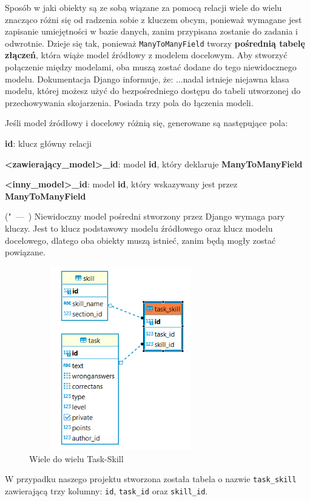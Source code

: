 \documentclass[oneside,polski,logo,indent]{amuthesis}
\let\oldquote\quote
\let\endoldquote\endquote
\renewenvironment{quote}[2][]
  {\if\relax\detokenize{#1}\relax
     \def\quoteauthor{#2}%
   \else
     \def\quoteauthor{#2~---~#1}%
   \fi
   \oldquote}
  {\par\nobreak\smallskip\hfill(\quoteauthor)%
   \endoldquote\addvspace{\bigskipamount}}
\begin{document}
Sposób w jaki obiekty są ze sobą wiązane za pomocą relacji wiele do wielu znacząco różni się od radzenia sobie z kluczem obcym, ponieważ wymagane jest zapisanie umiejętności w bazie danych, zanim przypisana zostanie do zadania i odwrotnie. Dzieje się tak, ponieważ \texttt{ManyToManyField} tworzy \textbf{pośrednią tabelę złączeń}, która wiąże model źródłowy z modelem docelowym. Aby stworzyć połączenie między modelami, oba muszą zostać dodane do tego niewidocznego modelu. Dokumentacja Django informuje, że:
\begin{quote}
"...nadal istnieje niejawna klasa modelu, której możesz użyć do bezpośredniego dostępu do tabeli utworzonej do przechowywania skojarzenia. Posiada trzy pola do łączenia modeli.

Jeśli model źródłowy i docelowy różnią się, generowane są następujące pola:

\textbf{id}: klucz główny relacji

\textbf{<zawierający\_model>\_id}: model \textbf{id}, który deklaruje \textbf{ManyToManyField}

\textbf{<inny\_model>\_id}: model \textbf{id}, który wskazywany jest przez \textbf{ManyToManyField}
\end{quote}
Niewidoczny model pośredni stworzony przez Django wymaga pary kluczy. Jest to klucz podstawowy modelu źródłowego oraz klucz modelu docelowego, dlatego oba obiekty muszą istnieć, zanim będą mogły zostać powiązane.

\begin{figure}[H]
  \centering
  \includegraphics[width=8cm, height=8cm]{task_skill.png}
  \caption{Wiele do wielu Task-Skill}
  \label{obraz-przyklad}
\end{figure}

W przypadku naszego projektu stworzona została tabela o nazwie \texttt{task\_skill} zawierającą trzy kolumny: \texttt{id}, \texttt{task\_id} oraz \texttt{skill\_id}.
\end{document}
